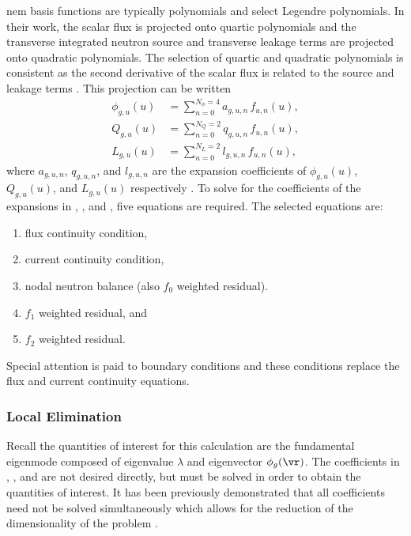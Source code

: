     \gls{nem} basis functions are typically polynomials and
    \citeauthor{qe2paper} select Legendre polynomials. In their work, the scalar
    flux is projected onto quartic polynomials and the transverse integrated
    neutron source and transverse leakage terms are projected onto quadratic
    polynomials. The selection of quartic and quadratic polynomials is
    consistent as the second derivative of the scalar flux is related to the
    source and leakage terms \cite{gehinThesis}. This projection can be written
    \begin{align}
      \label{eq:flux_expansion}
      \phi_{g,u}(u) &= \sum_{n=0}^{N_{\phi} = 4} a_{g,u,n} \, f_{u,n}(u), \\
      \label{eq:source_expansion}
      Q_{g,u}(u)    &= \sum_{n=0}^{N_Q = 2}      q_{g,u,n} \, f_{u,n}(u), \\
      \label{eq:leakage_expansion}
      L_{g,u}(u)    &= \sum_{n=0}^{N_L = 2}      l_{g,u,n} \, f_{u,n}(u),
    \end{align}
    where $a_{g,u,n}$, $q_{g,u,n}$, and $l_{g,u,n}$ are the expansion
    coefficients of $\phi_{g,u}(u)$, $Q_{g,u}(u)$, and $L_{g,u}(u)$ respectively
    \cite{qe2paper}. To solve for the coefficients of the expansions in
    , , and
    , five equations are required. The selected
    equations are:
    \begin{enumerate}
      \item flux continuity condition,
      \item current continuity condition,
      \item nodal neutron balance (also $f_0$ weighted residual).
      \item $f_1$ weighted residual, and
      \item $f_2$ weighted residual.
    \end{enumerate}
    Special attention is paid to boundary conditions and these conditions 
    replace the flux and current continuity equations.

    \subsubsection{Local Elimination}
      \label{sec:local_elimination}
      Recall the quantities of interest for this calculation are the fundamental
      eigenmode composed of eigenvalue $\lambda$ and eigenvector $\phi_g(\vr)$.
      The coefficients in , ,
      and  are not desired directly, but must be
      solved in order to obtain the quantities of interest. It has been
      previously demonstrated that all coefficients need not be solved
      simultaneously which allows for the reduction of the dimensionality of the
      problem \cite{gehinThesis}.

